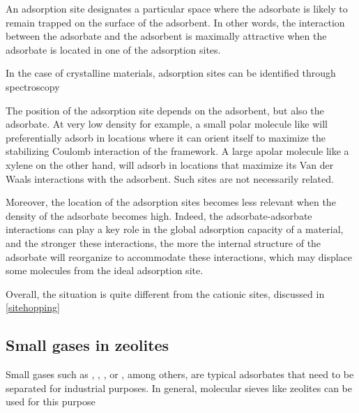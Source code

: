 \documentclass[main.tex]{subfiles}
\begin{document}

An adsorption site designates a particular space where the adsorbate is likely to remain trapped on the surface of the adsorbent. In other words, the interaction between the adsorbate and the adsorbent is maximally attractive when the adsorbate is located in one of the adsorption sites.

In the case of crystalline materials, adsorption sites can be identified through spectroscopy

The position of the adsorption site depends on the adsorbent, but also the adsorbate. At very low density for example, a small polar molecule like  will preferentially adsorb in locations where it can orient itself to maximize the stabilizing Coulomb interaction of the framework. A large apolar molecule like a xylene on the other hand, will adsorb in locations that maximize its Van der Waals interactions with the adsorbent. Such sites are not necessarily related.

Moreover, the location of the adsorption sites becomes less relevant when the density of the adsorbate becomes high. Indeed, the adsorbate-adsorbate interactions can play a key role in the global adsorption capacity of a material, and the stronger these interactions, the more the internal structure of the adsorbate will reorganize to accommodate these interactions, which may displace some molecules from the ideal adsorption site.

Overall, the situation is quite different from the cationic sites, discussed in \cref{sitehopping}

\subsection{Small gases in zeolites}

Small gases such as , , ,  or , among others, are typical adsorbates that need to be separated for industrial purposes. In general, molecular sieves like zeolites can be used for this purpose
\end{document}
